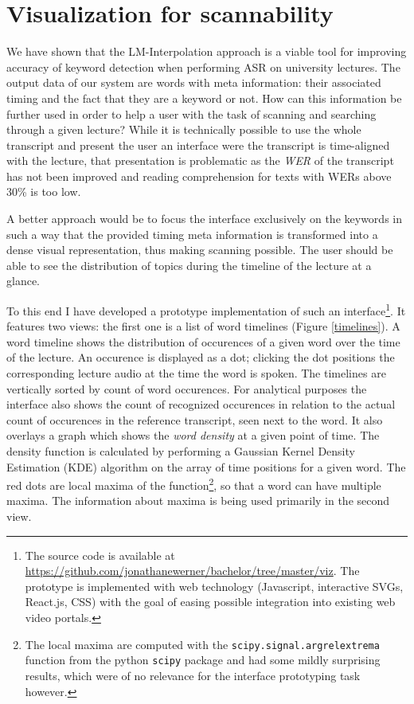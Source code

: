 \documentclass[]{article}
\begin{document}
\section{Visualization for scannability}\label{viz}

We have shown that the LM-Interpolation approach is a viable tool for
improving accuracy of keyword detection when performing ASR on
university lectures. The output data of our system are words with meta
information: their associated timing and the fact that they are a
keyword or not. How can this information be further used in order to
help a user with the task of scanning and searching through a given
lecture? While it is technically possible to use the whole transcript
and present the user an interface were the transcript is time-aligned
with the lecture, that presentation is problematic as the \emph{WER} of
the transcript has not been improved and reading comprehension for texts
with WERs above 30\% is too low.

A better approach would be to focus the interface exclusively on the
keywords in such a way that the provided timing meta information is
transformed into a dense visual representation, thus making scanning
possible. The user should be able to see the distribution of topics
during the timeline of the lecture at a glance.

To this end I have developed a prototype implementation of such an
interface\footnote{The source code is available at
  \url{https://github.com/jonathanewerner/bachelor/tree/master/viz}. The
  prototype is implemented with web technology (Javascript, interactive
  SVGs, React.js, CSS) with the goal of easing possible integration into
  existing web video portals.}. It features two views: the first one is
a list of word timelines (Figure \ref{timelines}). A word timeline shows
the distribution of occurences of a given word over the time of the
lecture. An occurence is displayed as a dot; clicking the dot positions
the corresponding lecture audio at the time the word is spoken. The
timelines are vertically sorted by count of word occurences. For
analytical purposes the interface also shows the count of recognized
occurences in relation to the actual count of occurences in the
reference transcript, seen next to the word. It also overlays a graph
which shows the \emph{word density} at a given point of time. The
density function is calculated by performing a Gaussian Kernel Density
Estimation (KDE) algorithm on the array of time positions for a given
word. The red dots are local maxima of the function\footnote{The local
  maxima are computed with the \texttt{scipy.signal.argrelextrema}
  function from the python \texttt{scipy} package and had some mildly
  surprising results, which were of no relevance for the interface
  prototyping task however.}, so that a word can have multiple maxima.
The information about maxima is being used primarily in the second view.
\end{document}
